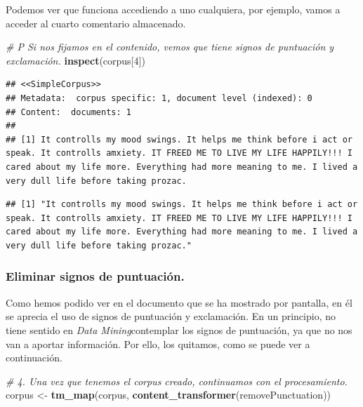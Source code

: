\documentclass[spanish,]{article}
\newenvironment{Shaded}{\begin{snugshade}}{\end{snugshade}}
\newcommand{\KeywordTok}[1]{\textcolor[rgb]{0.13,0.29,0.53}{\textbf{#1}}}
\newcommand{\DecValTok}[1]{\textcolor[rgb]{0.00,0.00,0.81}{#1}}
\newcommand{\StringTok}[1]{\textcolor[rgb]{0.31,0.60,0.02}{#1}}
\newcommand{\CommentTok}[1]{\textcolor[rgb]{0.56,0.35,0.01}{\textit{#1}}}
\newcommand{\OperatorTok}[1]{\textcolor[rgb]{0.81,0.36,0.00}{\textbf{#1}}}
\newcommand{\NormalTok}[1]{#1}
\begin{document}
Podemos ver que funciona accediendo a uno cualquiera, por ejemplo, vamos
a acceder al cuarto comentario almacenado.

\begin{Shaded}
\begin{Highlighting}[]
\CommentTok{# P Si nos fijamos en el contenido, vemos que tiene signos de puntuación y exclamación.}
\KeywordTok{inspect}\NormalTok{(corpus[}\DecValTok{4}\NormalTok{])}
\end{Highlighting}
\end{Shaded}

\begin{verbatim}
## <<SimpleCorpus>>
## Metadata:  corpus specific: 1, document level (indexed): 0
## Content:  documents: 1
## 
## [1] It controlls my mood swings. It helps me think before i act or speak. It controlls amxiety. IT FREED ME TO LIVE MY LIFE HAPPILY!!! I cared about my life more. Everything had more meaning to me. I lived a very dull life before taking prozac.
\end{verbatim}

\begin{Shaded}
\end{Shaded}

\begin{verbatim}
## [1] "It controlls my mood swings. It helps me think before i act or speak. It controlls amxiety. IT FREED ME TO LIVE MY LIFE HAPPILY!!! I cared about my life more. Everything had more meaning to me. I lived a very dull life before taking prozac."
\end{verbatim}

\subsubsection{Eliminar signos de
puntuación.}\label{eliminar-signos-de-puntuacion.}

Como hemos podido ver en el documento que se ha mostrado por pantalla,
en él se aprecia el uso de signos de puntuación y exclamación. En un
principio, no tiene sentido en \textit{Data Mining}contemplar los signos
de puntuación, ya que no nos van a aportar información. Por ello, los
quitamos, como se puede ver a continuación.

\begin{Shaded}
\begin{Highlighting}[]
\CommentTok{# 4. Una vez que tenemos el corpus creado, continuamos con el procesamiento. }
\NormalTok{corpus <-}\StringTok{ }\KeywordTok{tm_map}\NormalTok{(corpus, }\KeywordTok{content_transformer}\NormalTok{(removePunctuation))}
\end{Highlighting}
\end{Shaded}
\end{document}
